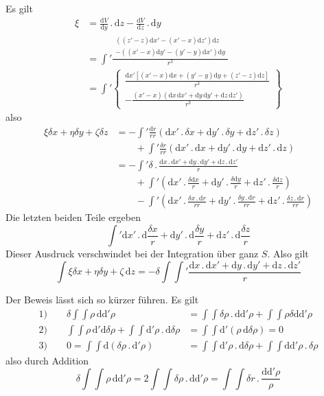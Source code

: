 Es gilt
\[
\begin{aligned}
\xi&=\frac{\mathrm dV}{\mathrm dy}\,.\,\mathrm dz-\frac{\mathrm dV}{\mathrm dz}\,.\,\mathrm dy\\[4pt]
&=\int'\frac{\begin{gathered}((z'-z)\mathrm dx'-(x'-x)\mathrm dz')\mathrm dz\\-((x'-x)\mathrm dy'-(y'-y)\mathrm dx')\mathrm dy\end{gathered}}{r^3}\\[4pt]
&=\int'\left\{\begin{gathered}\frac{\mathrm dx'[(x'-x)\mathrm dx+(y'-y)\mathrm dy+(z'-z)\mathrm dz]}{r^3}\\-\frac{(x'-x)(\mathrm dx\,\mathrm dx'+\mathrm dy\,\mathrm dy'+\mathrm dz\,\mathrm dz')}{r^3}\end{gathered}\right\}
\end{aligned}
\]
also
\[
\begin{aligned}
\xi\delta x+\eta\delta y+\zeta\delta z&=-\int'\frac{\mathrm dr}{rr}(\mathrm dx'\,.\,\delta x+\mathrm dy'\,.\,\delta y+\mathrm dz'\,.\,\delta z)\\
&\qquad+\int'\frac{\delta r}{rr}(\mathrm dx'\,.\,\mathrm dx+\mathrm dy'\,.\,\mathrm dy+\mathrm dz'\,.\,\mathrm dz)\\
&=-\int'\delta\,.\,\frac{\mathrm dx\,.\,\mathrm dx'+\mathrm dy\,.\,\mathrm dy'+\mathrm dz\,.\,\mathrm dz'}{r}\\
&\qquad+\int'\left(\mathrm dx'\,.\,\frac{\delta\mathrm dx}{r}+\mathrm dy'\,.\,\frac{\delta\mathrm dy}{r}+\mathrm dz'\,.\,\frac{\delta\mathrm dz}{r}\right)\\
&\qquad-\int'\left(\mathrm dx'\,.\,\frac{\delta x\,.\,\mathrm dr}{rr}+\mathrm dy'\,.\,\frac{\delta y\,.\,\mathrm dr}{rr}+\mathrm dz'\,.\,\frac{\delta z\,.\,\mathrm dr}{rr}\right)
\end{aligned}
\]
Die letzten beiden Teile ergeben
\[
\int'\mathrm dx'\,.\,\mathrm d\frac{\delta x}{r}+\mathrm dy'\,.\,\mathrm d\frac{\delta y}{r}+\mathrm dz'\,.\,\mathrm d\frac{\delta z}{r}
\]
Dieser Ausdruck verschwindet bei der Integration über ganz $S$. Also gilt
\[
\int\xi\delta x+\eta\delta y+\zeta\,\mathrm dz=-\delta\int\int'\frac{\mathrm dx\,.\,\mathrm dx'+\mathrm dy\,.\,\mathrm dy'+\mathrm dz\,.\,\mathrm dz'}{r}
\]

Der Beweis lässt sich so kürzer führen. Es gilt
\[
\begin{aligned}
\text{1)}\qquad\delta\int\int\rho\,\mathrm d\mathrm d'\rho&=\int\int\delta\rho\,.\,\mathrm d\mathrm d'\rho+\int\int\rho\delta\mathrm d\mathrm d'\rho\\[4pt]
\text{2)}\qquad\int\int\rho\,\mathrm d'\mathrm d\delta\rho+\int\int\mathrm d'\rho\,.\,\mathrm d\delta\rho&=\int\int\mathrm d'(\rho\,\mathrm d\delta\rho)=0\\[4pt]
\text{3)}\qquad0=\int\int\mathrm d(\delta\rho\,.\,\mathrm d'\rho)&=\int\int\mathrm d'\rho\,.\,\mathrm d\delta\rho+\int\int\mathrm d\mathrm d'\rho\,.\,\delta\rho
\end{aligned}
\]
also durch Addition
\[
\delta\int\int\rho\,\mathrm d\mathrm d'\rho=2\int\int\delta\rho\,.\,\mathrm d\mathrm d'\rho=\int\int\delta r\,.\,\frac{\mathrm d\mathrm d'\rho}{\rho}
\]

